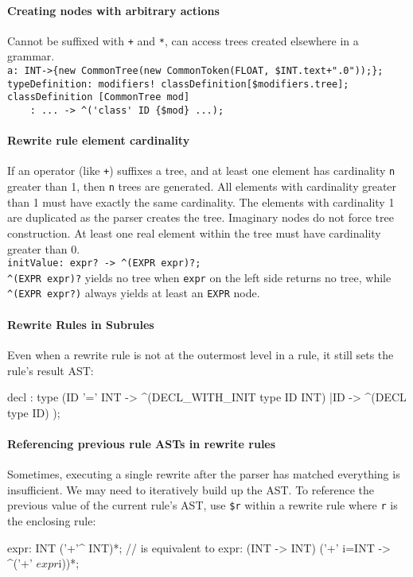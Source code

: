 \paragraph{Creating nodes with arbitrary actions}
Cannot be suffixed with \verb=+= and \verb=*=,
can access trees created elsewhere in a grammar.\\
\verb=a: INT->{new CommonTree(new CommonToken(FLOAT, $INT.text+".0"));};=\\
\verb=typeDefinition: modifiers! classDefinition[$modifiers.tree];=\\
\verb=classDefinition [CommonTree mod]=\\
\verb=    : ... -> ^('class' ID {$mod} ...);=

\paragraph{Rewrite rule element cardinality}
If an operator (like \verb=+=) suffixes a tree,
and at least one element has cardinality \verb=n= greater than 1,
then \verb=n= trees are generated.
All elements with cardinality greater than 1
must have exactly the same cardinality.
The elements with cardinality 1 are duplicated as the parser creates the tree.
Imaginary nodes do not force tree construction.
At least one real element within the tree must have cardinality greater than 0.
\\
\verb=initValue: expr? -> ^(EXPR expr)?;=\\
\verb=^(EXPR expr)?= yields no tree when \verb=expr= on the left side
returns no tree,
while \verb=^(EXPR expr?)= always yields at least an \verb=EXPR= node.

\paragraph{Rewrite Rules in Subrules}
Even when a rewrite rule is not at the outermost level in a rule,
it still sets the rule's result AST:
\begin{verbatimtab}
decl	: type
	(ID '=' INT	-> ^(DECL_WITH_INIT type ID INT)
	|ID		-> ^(DECL type ID)
	);
\end{verbatimtab}

\paragraph{Referencing previous rule ASTs in rewrite rules}
Sometimes, executing a single rewrite after the parser has matched everything
is insufficient.
We may need to iteratively build up the AST.
To reference the previous value of the current rule's AST,
use \verb=$r= within a rewrite rule where \verb=r= is the enclosing rule:
\begin{verbatimtab}
expr: INT ('+'^ INT)*;
// is equivalent to
expr: (INT -> INT) ('+' i=INT -> ^('+' $expr $i))*;
\end{verbatimtab}


